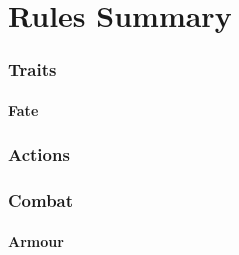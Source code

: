 \chapter{Rules Summary}

\physicalSkillChart

\mentalSkillChart

\begin{multicols}{2}

\subsection*{Traits}





\subsubsection*{Fate}


\subsubsection*{}




\subsection*{Actions}






\subsection*{Combat}





\commonWeaponsChart

\subsubsection*{Armour}



\commonArmourChart


\end{multicols}
